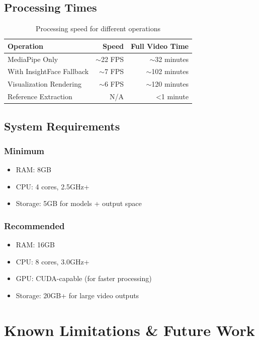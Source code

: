 \documentclass[11pt,a4paper]{article}
\begin{document}
\subsection{Processing Times}

\begin{table}[h]
\centering
\begin{tabular}{@{}lrr@{}}
\toprule
\textbf{Operation} & \textbf{Speed} & \textbf{Full Video Time} \\
\midrule
MediaPipe Only & $\sim$22 FPS & $\sim$32 minutes \\
With InsightFace Fallback & $\sim$7 FPS & $\sim$102 minutes \\
Visualization Rendering & $\sim$6 FPS & $\sim$120 minutes \\
Reference Extraction & N/A & <1 minute \\
\bottomrule
\end{tabular}
\caption{Processing speed for different operations}
\label{tab:processing_times}
\end{table}

\subsection{System Requirements}

\subsubsection{Minimum}
\begin{itemize}
    \item RAM: 8GB
    \item CPU: 4 cores, 2.5GHz+
    \item Storage: 5GB for models + output space
\end{itemize}

\subsubsection{Recommended}
\begin{itemize}
    \item RAM: 16GB
    \item CPU: 8 cores, 3.0GHz+
    \item GPU: CUDA-capable (for faster processing)
    \item Storage: 20GB+ for large video outputs
\end{itemize}

\section{Known Limitations \& Future Work}
\end{document}
